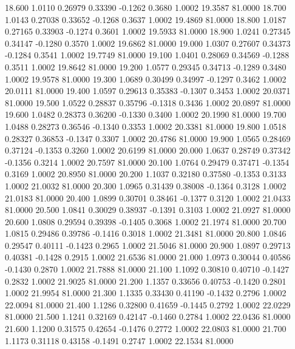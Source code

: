   18.600   1.0110   0.26979   0.33390  -0.1262   0.3680   1.0002  19.3587  81.0000
  18.700   1.0143   0.27038   0.33652  -0.1268   0.3637   1.0002  19.4869  81.0000
  18.800   1.0187   0.27165   0.33903  -0.1274   0.3601   1.0002  19.5933  81.0000
  18.900   1.0241   0.27345   0.34147  -0.1280   0.3570   1.0002  19.6862  81.0000
  19.000   1.0307   0.27607   0.34373  -0.1284   0.3541   1.0002  19.7749  81.0000
  19.100   1.0401   0.28069   0.34569  -0.1288   0.3511   1.0002  19.8642  81.0000
  19.200   1.0577   0.29345   0.34713  -0.1289   0.3480   1.0002  19.9578  81.0000
  19.300   1.0689   0.30499   0.34997  -0.1297   0.3462   1.0002  20.0111  81.0000
  19.400   1.0597   0.29613   0.35383  -0.1307   0.3453   1.0002  20.0371  81.0000
  19.500   1.0522   0.28837   0.35796  -0.1318   0.3436   1.0002  20.0897  81.0000
  19.600   1.0482   0.28373   0.36200  -0.1330   0.3400   1.0002  20.1990  81.0000
  19.700   1.0488   0.28273   0.36546  -0.1340   0.3353   1.0002  20.3381  81.0000
  19.800   1.0518   0.28327   0.36853  -0.1347   0.3307   1.0002  20.4786  81.0000
  19.900   1.0565   0.28469   0.37124  -0.1353   0.3260   1.0002  20.6199  81.0000
  20.000   1.0637   0.28749   0.37342  -0.1356   0.3214   1.0002  20.7597  81.0000
  20.100   1.0764   0.29479   0.37471  -0.1354   0.3169   1.0002  20.8950  81.0000
  20.200   1.1037   0.32180   0.37580  -0.1353   0.3133   1.0002  21.0032  81.0000
  20.300   1.0965   0.31439   0.38008  -0.1364   0.3128   1.0002  21.0183  81.0000
  20.400   1.0899   0.30701   0.38461  -0.1377   0.3120   1.0002  21.0433  81.0000
  20.500   1.0841   0.30029   0.38937  -0.1391   0.3103   1.0002  21.0927  81.0000
  20.600   1.0808   0.29594   0.39398  -0.1405   0.3068   1.0002  21.1974  81.0000
  20.700   1.0815   0.29486   0.39786  -0.1416   0.3018   1.0002  21.3481  81.0000
  20.800   1.0846   0.29547   0.40111  -0.1423   0.2965   1.0002  21.5046  81.0000
  20.900   1.0897   0.29713   0.40381  -0.1428   0.2915   1.0002  21.6536  81.0000
  21.000   1.0973   0.30044   0.40586  -0.1430   0.2870   1.0002  21.7888  81.0000
  21.100   1.1092   0.30810   0.40710  -0.1427   0.2832   1.0002  21.9025  81.0000
  21.200   1.1357   0.33656   0.40753  -0.1420   0.2801   1.0002  21.9954  81.0000
  21.300   1.1335   0.33430   0.41190  -0.1432   0.2796   1.0002  22.0094  81.0000
  21.400   1.1286   0.32800   0.41659  -0.1445   0.2792   1.0002  22.0229  81.0000
  21.500   1.1241   0.32169   0.42147  -0.1460   0.2784   1.0002  22.0436  81.0000
  21.600   1.1200   0.31575   0.42654  -0.1476   0.2772   1.0002  22.0803  81.0000
  21.700   1.1173   0.31118   0.43158  -0.1491   0.2747   1.0002  22.1534  81.0000
